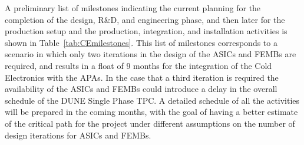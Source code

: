 A preliminary list of milestones indicating the current planning for the completion
of the design, R\&D, and engineering phase, and then later for the production setup
and the production, integration, and installation activities is shown in Table~\ref{tab:CEmilestones}.
This list of milestones corresponds to a scenario in which only two iterations in
the design of the ASICs and FEMBs are required, and results in a float of 9 months
for the integration of the Cold Electronics with the APAs. In the case that a third
iteration is required the availability of the ASICs and FEMBs could introduce a 
delay in the overall schedule of the DUNE Single Phase TPC. 
A detailed schedule of all the activities will be prepared in the coming months,
with the goal of having a better estimate of the critical path for the project
under different assumptions on the number of design iterations for ASICs and FEMBs.

